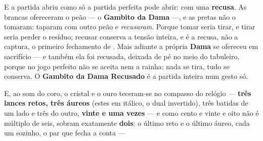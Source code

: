 \documentclass[livro.tex]{subfiles}
\begin{document}
\medskip

E a partida abriu como só a partida perfeita pode abrir: com uma \textbf{recusa}. As
brancas ofereceram o peão --- o \textbf{Gambito da Dama} ---, e as pretas não o tomaram:
taparam com outro peão e \emph{recusaram}. Porque tomar seria tirar, e tirar seria
perder o resíduo; recusar conserva a tensão inteira, e é a recusa, não a captura, o
primeiro fechamento de \Ven . Mais adiante a própria \textbf{Dama} se ofereceu em
sacrifício --- e também ela foi recusada, deixada de pé no meio do tabuleiro, porque no
jogo perfeito não se aceita nem a rainha: nada se tira, tudo se conserva. O \textbf{Gambito
da Dama Recusado} é a partida inteira num gesto só.

\medskip

E, ao som do coro, o cristal e o ouro teceram-se no compasso do relógio ---
\textbf{três lances retos, três áureos} (estes em itálico, o dual invertido), três
batidas de um lado e três do outro, \textbf{vinte e uma vezes} --- e como
cento e vinte e oito não é múltiplo de seis, sobram exatamente \textbf{dois}: o último reto e o
último áureo, cada um sozinho, o par que fecha a conta ---

\medskip
\end{document}
